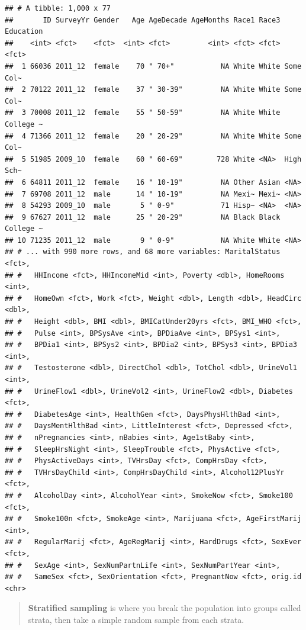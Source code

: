 \documentclass[]{book}
\begin{document}
\begin{verbatim}
## # A tibble: 1,000 x 77
##       ID SurveyYr Gender   Age AgeDecade AgeMonths Race1 Race3 Education
##    <int> <fct>    <fct>  <int> <fct>         <int> <fct> <fct> <fct>    
##  1 66036 2011_12  female    70 " 70+"           NA White White Some Col~
##  2 70122 2011_12  female    37 " 30-39"         NA White White Some Col~
##  3 70008 2011_12  female    55 " 50-59"         NA White White College ~
##  4 71366 2011_12  female    20 " 20-29"         NA White White Some Col~
##  5 51985 2009_10  female    60 " 60-69"        728 White <NA>  High Sch~
##  6 64811 2011_12  female    16 " 10-19"         NA Other Asian <NA>     
##  7 69708 2011_12  male      14 " 10-19"         NA Mexi~ Mexi~ <NA>     
##  8 54293 2009_10  male       5 " 0-9"           71 Hisp~ <NA>  <NA>     
##  9 67627 2011_12  male      25 " 20-29"         NA Black Black College ~
## 10 71235 2011_12  male       9 " 0-9"           NA White White <NA>     
## # ... with 990 more rows, and 68 more variables: MaritalStatus <fct>,
## #   HHIncome <fct>, HHIncomeMid <int>, Poverty <dbl>, HomeRooms <int>,
## #   HomeOwn <fct>, Work <fct>, Weight <dbl>, Length <dbl>, HeadCirc <dbl>,
## #   Height <dbl>, BMI <dbl>, BMICatUnder20yrs <fct>, BMI_WHO <fct>,
## #   Pulse <int>, BPSysAve <int>, BPDiaAve <int>, BPSys1 <int>,
## #   BPDia1 <int>, BPSys2 <int>, BPDia2 <int>, BPSys3 <int>, BPDia3 <int>,
## #   Testosterone <dbl>, DirectChol <dbl>, TotChol <dbl>, UrineVol1 <int>,
## #   UrineFlow1 <dbl>, UrineVol2 <int>, UrineFlow2 <dbl>, Diabetes <fct>,
## #   DiabetesAge <int>, HealthGen <fct>, DaysPhysHlthBad <int>,
## #   DaysMentHlthBad <int>, LittleInterest <fct>, Depressed <fct>,
## #   nPregnancies <int>, nBabies <int>, Age1stBaby <int>,
## #   SleepHrsNight <int>, SleepTrouble <fct>, PhysActive <fct>,
## #   PhysActiveDays <int>, TVHrsDay <fct>, CompHrsDay <fct>,
## #   TVHrsDayChild <int>, CompHrsDayChild <int>, Alcohol12PlusYr <fct>,
## #   AlcoholDay <int>, AlcoholYear <int>, SmokeNow <fct>, Smoke100 <fct>,
## #   Smoke100n <fct>, SmokeAge <int>, Marijuana <fct>, AgeFirstMarij <int>,
## #   RegularMarij <fct>, AgeRegMarij <int>, HardDrugs <fct>, SexEver <fct>,
## #   SexAge <int>, SexNumPartnLife <int>, SexNumPartYear <int>,
## #   SameSex <fct>, SexOrientation <fct>, PregnantNow <fct>, orig.id <chr>
\end{verbatim}

\begin{quote}
\textbf{Stratified sampling} is where you break the population into groups
called strata, then take a simple random sample from each strata.
\end{quote}
\end{document}
